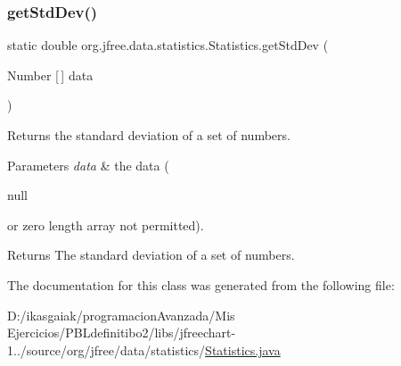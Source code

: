 \subsubsection{\texorpdfstring{get\+Std\+Dev()}{getStdDev()}}
{\footnotesize\ttfamily static double org.\+jfree.\+data.\+statistics.\+Statistics.\+get\+Std\+Dev (\begin{DoxyParamCaption}\item[{Number \mbox{[}$\,$\mbox{]}}]{data }\end{DoxyParamCaption})\hspace{0.3cm}{\ttfamily [static]}}

Returns the standard deviation of a set of numbers.


\begin{DoxyParams}{Parameters}
{\em data} & the data (
\begin{DoxyCode}
null 
\end{DoxyCode}
 or zero length array not permitted).\\
\hline
\end{DoxyParams}
\begin{DoxyReturn}{Returns}
The standard deviation of a set of numbers. 
\end{DoxyReturn}


The documentation for this class was generated from the following file\+:\begin{DoxyCompactItemize}
\item 
D\+:/ikasgaiak/programacion\+Avanzada/\+Mis Ejercicios/\+P\+B\+Ldefinitibo2/libs/jfreechart-\/1../source/org/jfree/data/statistics/\mbox{\hyperlink{_statistics_8java}{Statistics.\+java}}\end{DoxyCompactItemize}
